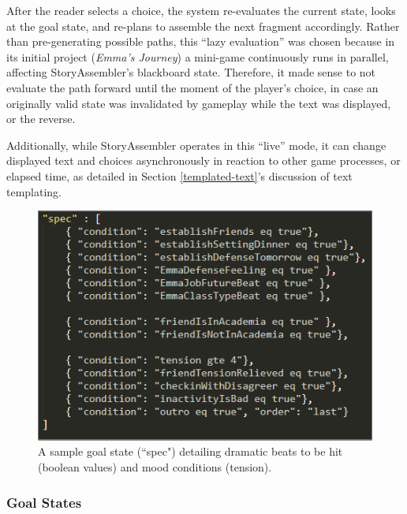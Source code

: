 After the reader selects a choice, the system re-evaluates the current state, looks at the goal state, and re-plans to assemble the next fragment accordingly. Rather than pre-generating possible paths, this ``lazy evaluation'' was chosen because in its initial project (\textit{Emma's Journey}) a mini-game continuously runs in parallel, affecting StoryAssembler's blackboard state. Therefore, it made sense to not evaluate the path forward until the moment of the player's choice, in case an originally valid state was invalidated by gameplay while the text was displayed, or the reverse. 

Additionally, while StoryAssembler operates in this ``live'' mode, it can change displayed text and choices asynchronously in reaction to other game processes, or elapsed time, as detailed in Section \ref{templated-text}'s discussion of text templating.


\begin{figure}
    \centering
    \includegraphics[width=\textwidth]{figures/3-StoryAssembler/story-spec.png}
    \caption{A sample goal state (``spec") detailing dramatic beats to be hit (boolean values) and mood conditions (tension).}
    \label{fig:story-spec}
\end{figure}


\subsubsection{Goal States}

